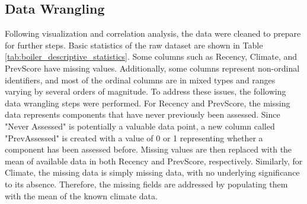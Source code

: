 \documentclass[NewProceedings,letterpaper,NoPageNumbers,NoLineNumbers, DoubleSpace]{ascelike-new}
\begin{document}
\FloatBarrier

\subsection{Data Wrangling}

Following visualization and correlation analysis, the data were cleaned to prepare for further steps. Basic statistics of the raw dataset are shown in Table \ref{tab:boiler_descriptive_statistics}. Some columns such as Recency, Climate, and PrevScore have missing values. Additionally, some columns represent non-ordinal identifiers, and most of the ordinal columns are in mixed types and ranges varying by several orders of magnitude. To address these issues, the following data wrangling steps were performed. For Recency and PrevScore, the missing data represents components that have never previously been assessed. Since "Never Assessed" is potentially a valuable data point, a new column called "PrevAssessed" is created with a value of 0 or 1 representing whether a component has been assessed before. Missing values are then replaced with the mean of available data in both Recency and PrevScore, respectively. Similarly, for Climate, the missing data is simply missing data, with no underlying significance to its absence. Therefore, the missing fields are addressed by populating them with the mean of the known climate data.
\end{document}

